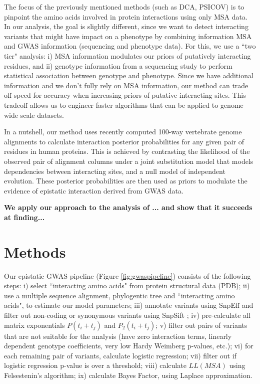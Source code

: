 The focus of the previously mentioned methods (such as DCA, PSICOV) is to pinpoint the amino acids involved in protein interactions using only MSA data. In our analysis, the goal is slightly different, since we want to detect interacting variants that might have impact on a phenotype by combining information MSA and GWAS information (sequencing and phenotype data). For this, we use a ``two tier" analysis: i) MSA information modulates our priors of putatively interacting residues, and ii) genotype information from a sequencing study to perform statistical association between genotype and phenotype. Since we have additional information and we don’t fully rely on MSA information, our method can trade off speed for accuracy when increasing priors of putative interacting sites. This tradeoff allows us to engineer faster algorithms that can be applied to genome wide scale datasets.

In a nutshell, our method uses recently computed 100-way vertebrate genome alignments to calculate interaction posterior probabilities for any given pair of residues in human proteins. This is achieved by contrasting the likelihood of the observed pair of alignment columns under a joint substitution model that models dependencies between interacting sites, and a null model of independent evolution.  These posterior probabilities are then used as priors to modulate the evidence of epistatic interaction derived from GWAS data. 

\textbf{We apply our approach to the analysis of ... and show that it succeeds at finding...}

\section{Methods}

Our epistatic GWAS pipeline (Figure \ref{fig:gwaspipeline}) consists of the following steps: i) select ``interacting amino acids" from protein structural data (PDB); ii) use a multiple sequence alignment, phylogentic tree and ``interacting amino acids", to estimate our model parameters; iii) annotate variants using SnpEff \cite{REF} and filter out non-coding or synonymous variants using SnpSift \cite{}; iv) pre-calculate all matrix exponentials $P(t_i+t_j)$ and $P_2(t_i+t_j)$; v) filter out pairs of variants that are not suitable for the analysis (have zero interaction terms, linearly dependent genotype coefficients, very low Hardy Weimberg p-values, etc.); vi) for each remaining pair of variants, calculate logistic regression; vii) filter out if logistic regression p-value is over a threshold; viii) calculate $LL(MSA)$ using Felsestenin’s algorithm; ix) calculate Bayes Factor, using Laplace approximation.

